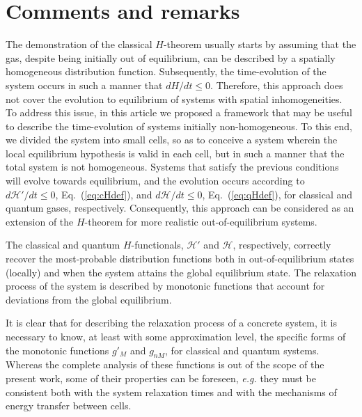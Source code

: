 
\section{Comments and remarks}\label{sec:disscussion}

The demonstration of the classical $H$-theorem usually starts by assuming that the gas,
despite being initially out of equilibrium, can be described by a
spatially homogeneous distribution function. 
Subsequently, the time-evolution of the system occurs in such a manner that $dH/dt \leq 0$. 
Therefore, this approach does not cover the evolution to equilibrium of systems with spatial inhomogeneities.
To address this issue, in this article we
proposed a framework that may be useful to describe the time-evolution of systems
initially non-homogeneous. To this end, we divided the
system into small cells, so as to conceive a system wherein the local equilibrium
hypothesis is valid in each cell, but in such a manner that the total system is not homogeneous. Systems
that satisfy the previous conditions will evolve towards equilibrium, and the evolution
occurs according to $d\mathcal{H}'/dt\leq0$, Eq.~(\ref{eq:cHdef}),
and $d\mathcal{H}/dt\leq0$, Eq.~(\ref{eq:qHdef}), for classical and quantum gases, respectively.
Consequently, this approach can be considered as an extension of the $H$-theorem
for more realistic out-of-equilibrium systems.

The classical and quantum $H$-functionals, $\mathcal{H}'$ and $\mathcal{H}$, respectively,
correctly recover the most-probable distribution
functions both in out-of-equilibrium states (locally) and when the system attains the global
equilibrium state. The relaxation process of the system is described by
monotonic functions that account for deviations from the global equilibrium.

It is clear that for describing the relaxation process of a concrete system,
it is necessary to know, at least with some approximation level, the specific forms of the
monotonic functions $g'_M$ and $g_{nM}$, for classical and quantum systems.
Whereas the complete analysis of these functions is out of the scope of the present work,
some of their properties can be foreseen, \textit{e.g.} they must
be consistent both with the system relaxation times and with the mechanisms of 
energy transfer between cells.

